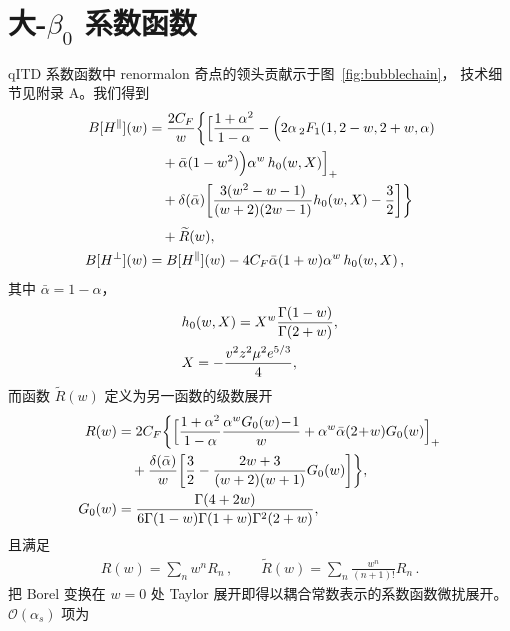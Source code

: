 \section{大-$\beta_0$ 系数函数}\label{sect_bubbles}%
%

qITD 系数函数中 renormalon 奇点的领头贡献示于图~\ref{fig:bubblechain}，
技术细节见附录 A。我们得到
\begin{align}
\label{B[H]}
B[H^\parallel](w)&=\frac{2C_F}{w} \biggl\{\Big[\frac{1+\alpha^2}{1-\alpha}
- \Big(2\alpha\,{}_2F_1(1,2-w,2+w,\alpha)
\notag\\&\quad
 +\bar \alpha (1-w^2)\Big)\alpha^w\,h_0(w,X)\Big]_+
\notag\\ &\quad
+\delta(\bar \alpha)\bigg[\frac{3(w^2-w-1)}{(w+2)(2w-1)}h_0(w,X)-\frac{3}{2}\bigg]\biggr\}
\notag\\[1mm] &\quad
+\widetilde{R}(w),
\\
B[H^\perp](w)&= B[H^\parallel](w)-4C_F \bar \alpha(1+w)\alpha^w\,h_0(w,X)\,,
\end{align}
其中 $\bar\alpha = 1-\alpha$，
\begin{align}
& h_0(w,X)=X^w \frac{\Gamma(1-w)}{\Gamma(2+w)},
\notag\\
&X=- \frac{v^2 z^2 \mu^2 e^{5/3}}{4},
\end{align}
而函数 $\widetilde{R}(w)$ 定义为另一函数的级数展开
\begin{align}
R(w)&=2C_F \biggl\{\Big[\frac{1+\alpha^2}{1-\alpha}\frac{\alpha^wG_0(w)\!-\!1}{w}+\alpha^w \bar \alpha (2\!+\!w)G_0(w)\Big]_+
\notag\\&\quad
+\frac{\delta(\bar \alpha)}{w}\bigg[\frac{3}{2}-\frac{2w+3}{(w+2)(w+1)}G_0(w)\bigg]\biggr\},
\notag\\
G_0(w)&=\frac{\Gamma(4+2w)}{6\Gamma(1-w)\Gamma(1+w)\Gamma^2(2+w)},
\end{align}
且满足
\begin{align}
  R(w) = \sum_n w^n R_n\,, \qquad \widetilde{R}(w) = \sum_n \frac{w^n}{(n+1)!} R_n \,.
\end{align}
把 Borel 变换在 $w=0$ 处 Taylor 展开即得以耦合常数表示的系数函数微扰展开。
$\mathcal{O}(\alpha_s)$ 项为
